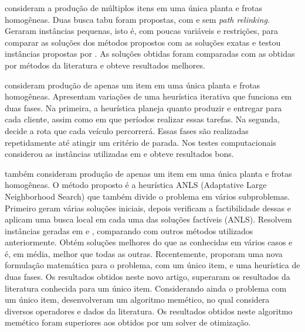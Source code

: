 \documentclass[11pt]{article}
\begin{document}
 consideram a produção de múltiplos itens em uma única planta e frotas homogêneas. Duas busca tabu foram propostas, com e sem \textit{path relinking}. Geraram instâncias pequenas, isto é, com poucas variáveis e restrições, para comparar as soluções dos métodos propostos com as soluções exatas e testou instâncias propostas por . As soluções obtidas foram comparadas com as obtidas por métodos da literatura e obteve resultados melhores.

 consideram produção de apenas um item em uma única planta e frotas homogêneas. Apresentam variações de uma heurística iterativa que funciona em duas fases. Na primeira, a heurística planeja quanto produzir e entregar para cada cliente, assim como em que períodos realizar essas tarefas. Na segunda, decide a rota que cada veículo percorrerá. Essas fases são realizadas repetidamente até atingir um critério de parada. Nos testes computacionais considerou as instâncias utilizadas em  e obteve resultados bons.

 também consideram produção de apenas um item em uma única planta e frotas homogêneas. O método proposto é a heurística ANLS (Adaptative Large Neighborhood Search) que também divide o problema em vários subproblemas. Primeiro  geram várias soluções iniciais, depois verificam a factibilidade dessas e aplicam uma busca local em cada uma das soluções factíveis (ANLS). Resolvem instâncias geradas em  e , comparando com outros métodos utilizados anteriormente. Obtém soluções melhores do que as conhecidas em vários casos e é, em média, melhor que todas as outras. Recentemente,  proporam uma nova formulação matemática para o problema, com um único item, e uma heurística de duas fases. Os resultados obtidos neste novo artigo, superaram os resultados da literatura conhecida para um único item. Considerando ainda o problema com um único item,  desenvolveram um algoritmo memético, no qual considera diversos operadores e dados da literatura. Os resultados obtidos neste algoritmo memético foram superiores aos obtidos por um solver de otimização. 
\end{document}
